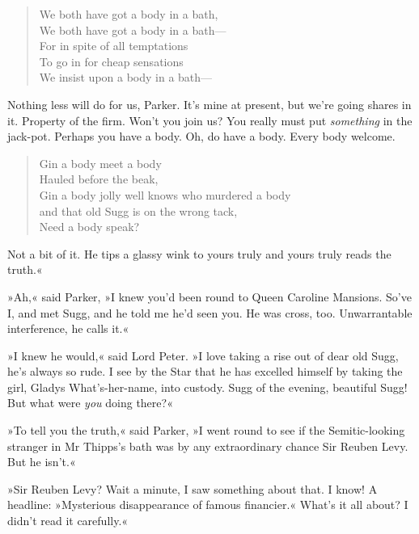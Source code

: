 \begin{verse}
We both have got a body in a bath,\\
We both have got a body in a bath---\\
For in spite of all temptations\\
To go in for cheap sensations\\
We insist upon a body in a bath---\\
\end{verse}

Nothing less will do for us, Parker. It's mine at present, but we're going shares in it. Property of the firm. Won't you join us? You really must put \textit{something} in the jack-pot. Perhaps you have a body. Oh, do have a body. Every body welcome.

\begin{verse}
Gin a body meet a body\\
Hauled before the beak,\\
Gin a body jolly well knows who murdered a body\\
and that old Sugg is on the wrong tack,\\
Need a body speak?
\end{verse}

Not a bit of it. He tips a glassy wink to yours truly and yours truly reads the truth.«

»Ah,« said Parker, »I knew you'd been round to Queen Caroline Mansions. So've I, and met Sugg, and he told me he'd seen you. He was cross, too. Unwarrantable interference, he calls it.«

»I knew he would,« said Lord Peter. »I love taking a rise out of dear old Sugg, he's always so rude. I see by the Star that he has excelled himself by taking the girl, Gladys What's-her-name, into custody. Sugg of the evening, beautiful Sugg! But what were \textit{you} doing there?«

»To tell you the truth,« said Parker, »I went round to see if the Semitic-looking stranger in Mr Thipps's bath was by any extraordinary chance Sir Reuben Levy. But he isn't.«

»Sir Reuben Levy? Wait a minute, I saw something about that. I know! A headline: »Mysterious disappearance of famous financier.« What's it all about? I didn't read it carefully.«

